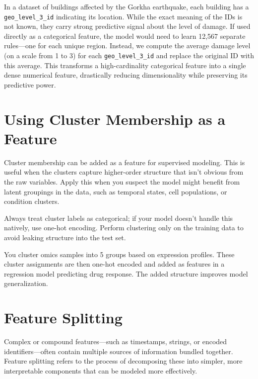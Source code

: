 \documentclass[12pt,openany]{book}
\begin{document}
\begin{examplebox}
In a dataset of buildings affected by the Gorkha earthquake, each building has a \texttt{geo\_level\_3\_id} indicating its location. While the exact meaning of the IDs is not known, they carry strong predictive signal about the level of damage. If used directly as a categorical feature, the model would need to learn 12,567 separate rules—one for each unique region. Instead, we compute the average damage level (on a scale from 1 to 3) for each \texttt{geo\_level\_3\_id} and replace the original ID with this average. This transforms a high-cardinality categorical feature into a single dense numerical feature, drastically reducing dimensionality while preserving its predictive power.
\end{examplebox}



\section{Using Cluster Membership as a Feature}

Cluster membership can be added as a feature for supervised modeling. This is useful when the clusters capture higher-order structure that isn't obvious from the raw variables. Apply this when you suspect the model might benefit from latent groupings in the data, such as temporal states, cell populations, or condition clusters.

Always treat cluster labels as categorical; if your model doesn’t handle this natively, use one-hot encoding. Perform clustering only on the training data to avoid leaking structure into the test set.

\begin{examplebox}
You cluster omics samples into 5 groups based on expression profiles. These cluster assignments are then one-hot encoded and added as features in a regression model predicting drug response. The added structure improves model generalization.
\end{examplebox}



\section{Feature Splitting}

Complex or compound features—such as timestamps, strings, or encoded identifiers—often contain multiple sources of information bundled together. Feature splitting refers to the process of decomposing these into simpler, more interpretable components that can be modeled more effectively.
\end{document}
